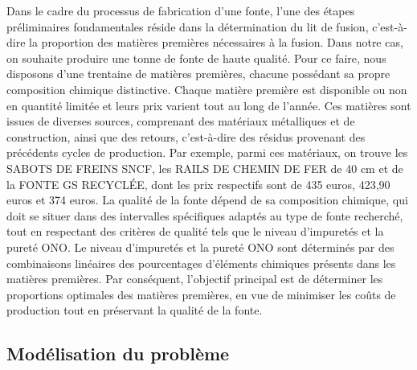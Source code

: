 \documentclass[12pt]{article}
\begin{document}
Dans le cadre du processus de fabrication d'une fonte, l'une des étapes préliminaires fondamentales
réside dans la détermination du lit de fusion, c'est-à-dire la proportion des matières premières
nécessaires à la fusion. Dans notre cas, on souhaite  produire une tonne de fonte de haute qualité.
Pour ce faire, nous disposons d'une trentaine de matières premières, chacune possédant sa propre
composition chimique distinctive. Chaque matière première est disponible ou non en quantité limitée
et leurs prix varient tout au long de l'année. Ces matières sont issues de diverses sources,
comprenant des matériaux métalliques et de construction, ainsi que des retours, c'est-à-dire
des résidus provenant des précédents cycles de production. Par exemple, parmi ces matériaux,
on trouve les SABOTS DE FREINS SNCF, les RAILS DE CHEMIN DE FER de 40 cm et de la FONTE GS RECYCLÉE,
dont les prix respectifs sont de 435 euros, 423,90 euros et 374 euros. La qualité de la fonte dépend
de sa composition chimique, qui doit se situer dans des intervalles spécifiques adaptés au type
de fonte recherché, tout en respectant des critères de qualité tels que le niveau d'impuretés et
la pureté ONO. Le niveau d'impuretés et la pureté ONO sont déterminés par des combinaisons linéaires
des pourcentages d'éléments chimiques présents dans les matières premières. Par conséquent,
l'objectif principal est de déterminer les proportions optimales des matières premières,
en vue de minimiser les coûts de production tout en préservant la qualité de la fonte.

\subsection{Modélisation du problème}
\end{document}
